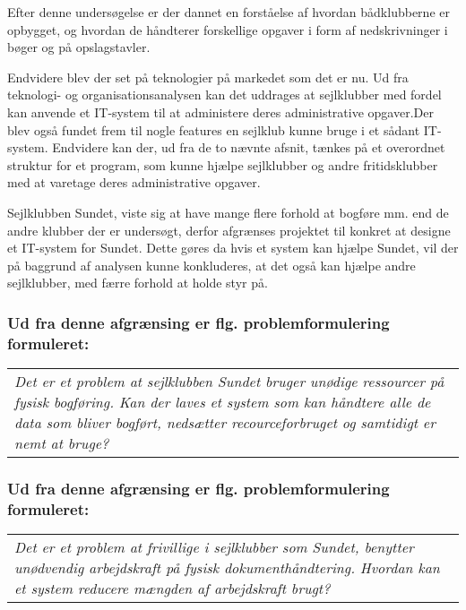 Efter denne undersøgelse er der dannet en forståelse af hvordan bådklubberne er opbygget, og hvordan de håndterer
forskellige opgaver i form af nedskrivninger i bøger og på opslagstavler.

Endvidere blev der set på teknologier på markedet som det er nu. Ud fra teknologi- og organisationsanalysen kan det
uddrages at sejlklubber med fordel kan anvende et IT-system til at administere deres administrative opgaver.Der blev
også fundet frem til nogle features en sejlklub kunne bruge i et sådant IT-system. Endvidere kan der, ud fra de to
nævnte afsnit, tænkes på et overordnet struktur for et program, som kunne hjælpe sejlklubber og andre fritidsklubber med
at varetage deres administrative opgaver.

Sejlklubben Sundet, viste sig at have mange flere forhold at bogføre mm. end de andre klubber der er undersøgt, derfor afgrænses projektet til konkret at designe et IT-system for Sundet. Dette gøres da hvis et system kan hjælpe Sundet, vil der på baggrund af analysen kunne konkluderes, at det også kan hjælpe andre sejlklubber, med færre forhold at holde styr på. 

\subsubsection*{Ud fra denne afgrænsing er flg. problemformulering formuleret:}
\begin{center}
\begin{tabular}{|p{14cm}|}
\textit{Det er et problem at sejlklubben Sundet bruger unødige ressourcer på fysisk bogføring. Kan der laves et system som kan håndtere alle de data som bliver bogført, nedsætter recourceforbruget og samtidigt er nemt at bruge? }
\end{tabular}
\end{center}
\subsubsection*{Ud fra denne afgrænsing er flg. problemformulering formuleret:}
\begin{center}
\begin{tabular}{|p{14cm}|}
\textit{Det er et problem at frivillige i sejlklubber som Sundet, benytter unødvendig arbejdskraft på fysisk dokumenthåndtering. Hvordan kan et system reducere mængden af arbejdskraft brugt? }
\end{tabular}
\end{center}

